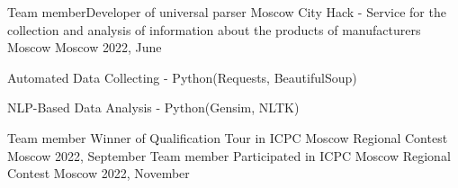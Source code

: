 \begin{cventries}
    \cventry
        {Team member{\enskip\cdotp\enskip}Developer of universal parser} %
        {Moscow City Hack - Service for the collection and analysis of information about the products of manufacturers Moscow} %
        {Moscow} %
        {2022, June} %
        { %
            \begin{cvitems}
                \item {Automated Data Collecting - Python(Requests, BeautifulSoup)}
                \item {NLP-Based Data Analysis - Python(Gensim, NLTK)}
            \end{cvitems}
        }

	\cventry
		{Team member}
		{Winner of Qualification Tour in ICPC Moscow Regional Contest}  %
		{Moscow} %
		{2022, September} %
		{}
	\cventry
		{Team member}
		{Participated in ICPC Moscow Regional Contest}  %
		{Moscow} %
		{2022, November} %
		{}







\end{cventries}
